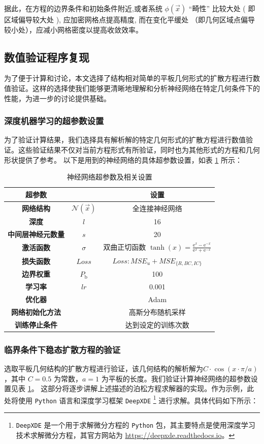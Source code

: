 \documentclass{Sichuan Normal University}
\begin{document}
据此，在方程的边界条件和初始条件附近,或者系统 $\phi(\vec{x})$ “畸性” 比较大处 ( 即区域偏导较大处 ), 应加密网格点提高精度, 而在变化平缓处 （即几何区域点偏导较小处），应减小网格密度以提高收敛效率。
\subsection{数值验证程序复现}
为了便于计算和讨论，本文选择了结构相对简单的平板几何形式的扩散方程进行数值验证。这样的选择使我们能够更清晰地理解和分析神经网络在特定几何条件下的性能，为进一步的讨论提供基础。
\subsubsection{深度机器学习的超参数设置}
为了验证计算结果，我们选择具有解析解的特定几何形式的扩散方程进行数值验证。这些验证结果不仅对当前方程形式有所验证，同时也为其他形式的方程和几何形状提供了参考。
以下是用到的神经网络的具体超参数设置，如表 \ref{tab:hyperparameter_settings} 所示：
\begin{table}[H]
    \centering
    \begin{tabular}{ccc}
        \toprule
        \textbf{超参数} && \textbf{设置} \\
        \midrule
        \textbf{网络结构} &$\mathcal{N}(\vec{x})$& 全连接神经网络 \\
        \textbf{深度} &$l$& 16 \\
        \textbf{中间层神经元数量}  &$s$& 20 \\
        \textbf{激活函数} &$\sigma$& 双曲正切函数  $\tanh(x)=\frac{\mathrm{e}^x-\mathrm{e}^{-x}}{\mathrm{e}^x+\mathrm{e}^{-x}}$ \\
        \textbf{损失函数} &$Loss$& $Loss: M S E_u+M S E_{\{R, B C, I C\}}$ \\
        \textbf{边界权重}  &$P_{\mathrm{b}}$& 100 \\
        \textbf{学习率} &$lr$& 0.001  \\
        \textbf{优化器} && Adam  \\
        \textbf{网络初始化方法} && 高斯分布随机采样 \\
        \textbf{训练停止条件} && 达到设定的训练次数\\
        \bottomrule
    \end{tabular}
    \caption{神经网络超参数及相关设置}
    \label{tab:hyperparameter_settings}
\end{table}

\subsubsection{临界条件下稳态扩散方程的验证}
选取平板几何结构的扩散方程进行验证，该几何结构的解析解为$C\cdot\cos(x\cdot\pi/a)$，其中 $C=0.5$ 为常数，$a=1$ 为平板的长度。我们验证计算神经网络的超参数设置见表 \ref{tab:hyperparameter_settings}。
这部分将逐步讲解上述描述的泊松方程求解器的实现。作为示例，此处将使用 \texttt{Python} 语言和深度学习框架 \texttt{DeepXDE} \footnote{\texttt{DeepXDE} 是一个用于求解微分方程的 \texttt{Python} 包，其主要特点是使用深度学习技术求解微分方程，其官方网站为 \url{https://deepxde.readthedocs.io}。}
进行求解。具体代码如下所示：
\end{document}
